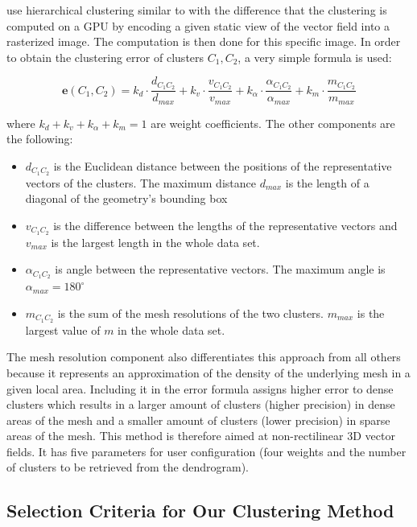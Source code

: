 \citet{Peng12} use hierarchical clustering similar to \citet{Telea99} with the difference that the clustering is computed on a GPU by encoding a given static view of the vector field into a rasterized image. The computation is then done for this specific image. In order to obtain the clustering error of clusters \(C_1, C_2\), a very simple formula is used:

\begin{equation} \label{eq:clustering_error}
\bm{e}(C_1,C_2) = k_d \cdot \frac{d_{C_1C_2}}{d_{max}} + k_v \cdot \frac{v_{C_1C_2}}{v_{max}} + k_\alpha \cdot \frac{\alpha_{C_1C_2}}{\alpha_{max}} + k_m \cdot \frac{m_{C_1C_2}}{m_{max}}
\end{equation}

where \(k_d + k_v + k_\alpha + k_m = 1\) are weight coefficients. The other components are the following:

\begin{itemize}
\item \(d_{C_1C_2}\) is the Euclidean distance between the positions of the representative vectors of the clusters. The maximum distance \(d_{max}\) is the length of a diagonal of the geometry's bounding box
\item \(v_{C_1C_2}\) is the difference between the lengths of the representative vectors and \(v_{max}\) is the largest length in the whole data set.
\item \(\alpha_{C_1C_2}\) is angle between the representative vectors. The maximum angle is \(\alpha_{max} = 180^\circ\)
\item \(m_{C_1C_2}\) is the sum of the mesh resolutions of the two clusters. \(m_{max}\) is the largest value of \(m\) in the whole data set.
\end{itemize}

The mesh resolution component also differentiates this approach from all others because it represents an approximation of the density of the underlying mesh in a given local area. Including it in the error formula assigns higher error to dense clusters which results in a larger amount of clusters (higher precision) in dense areas of the mesh and a smaller amount of clusters (lower precision) in sparse areas of the mesh. This method is therefore aimed at non-rectilinear 3D vector fields. It has five parameters for user configuration (four weights and the number of clusters to be retrieved from the dendrogram).
\subsection{Selection Criteria for Our Clustering Method}
\label{subsec:analysis-field_clustering-sel_criteria}

